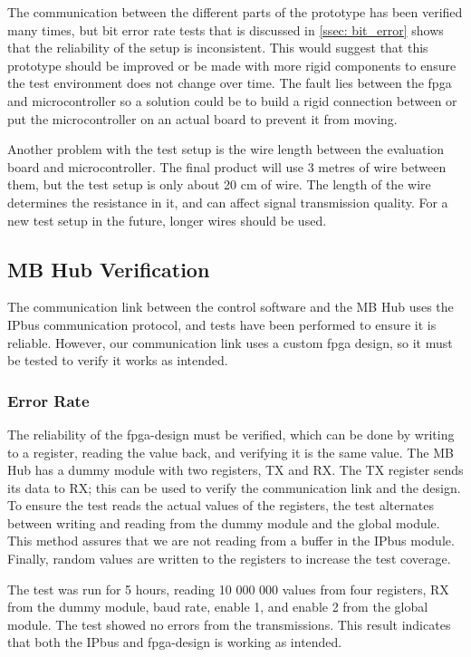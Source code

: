 \documentclass[main.tex]{subfiles}
\begin{document}
The communication between the different parts of the prototype has been verified many times, but bit error rate tests that is discussed in \autoref{ssec: bit_error} shows that the reliability of the setup is inconsistent. This would suggest that this prototype should be improved or be made with more rigid components to ensure the test environment does not change over time. The fault lies between the \gls{fpga} and microcontroller so a solution could be to build a rigid connection between or put the microcontroller on an actual board to prevent it from moving.

Another problem with the test setup is the wire length between the evaluation board and microcontroller. The final product will use 3 metres of wire between them, but the test setup is only about 20 cm of wire. The length of the wire determines the resistance in it, and can affect signal transmission quality. For a new test setup in the future, longer wires should be used.

\subsection{MB Hub Verification}

The communication link between the control software and the MB Hub uses the IPbus communication protocol, and tests have been performed to ensure it is reliable\cite{IPbus}. However, our communication link uses a custom \gls{fpga} design, so it must be tested to verify it works as intended.

\subsubsection{Error Rate}

The reliability of the \gls{fpga}-design must be verified, which can be done by writing to a register, reading the value back, and verifying it is the same value. The MB Hub has a dummy module with two registers, TX and RX. The TX register sends its data to RX; this can be used to verify the communication link and the design. To ensure the test reads the actual values of the registers, the test alternates between writing and reading from the dummy module and the global module. This method assures that we are not reading from a buffer in the IPbus module. Finally, random values are written to the registers to increase the test coverage.

The test was run for 5 hours, reading 10 000 000 values from four registers, RX from the dummy module, baud rate, enable 1, and enable 2 from the global module. The test showed no errors from the transmissions. This result indicates that both the IPbus and \gls{fpga}-design is working as intended.
\end{document}
